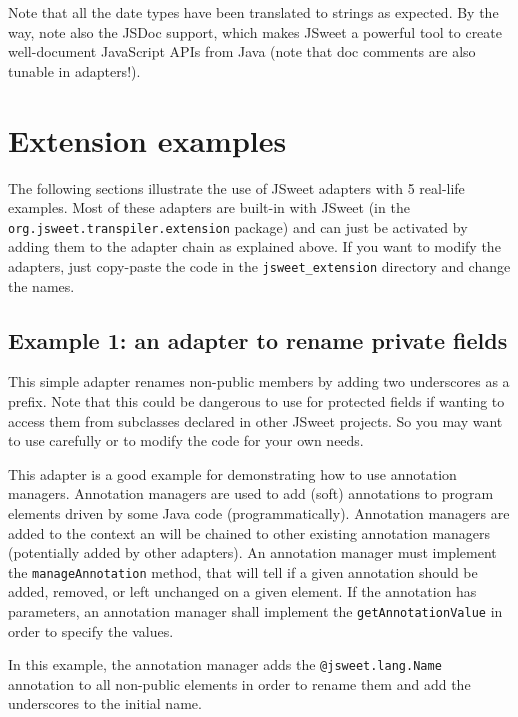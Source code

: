 \documentclass[a4paper]{report}
\begin{document}
Note that all the date types have been translated to strings as expected. By the way, note also the JSDoc support, which makes JSweet a powerful tool to create well-document JavaScript APIs from Java (note that doc comments are also tunable in adapters!).

\section{Extension examples}

The following sections illustrate the use of JSweet adapters with 5 real-life examples. Most of these adapters are built-in with JSweet (in the \texttt{org\-.jsweet\-.transpiler\-.extension} package) and can just be activated by adding them to the adapter chain as explained above. If you want to modify the adapters, just copy-paste the code in the \texttt{jsweet\_extension} directory and change the names.

\subsection{Example 1: an adapter to rename private fields}

This simple adapter renames non-public members by adding two underscores as a prefix.
Note that this could be dangerous to use for protected fields if wanting to access them from subclasses declared in other JSweet projects. So you may want to use carefully or to modify the code for your own needs.

This adapter is a good example for demonstrating how to use annotation managers. Annotation managers are used to add (soft) annotations to program elements driven by some Java code (programmatically). Annotation managers are added to the context an will be chained to other existing annotation managers (potentially added by other adapters). An annotation manager must implement the  \texttt{manageAnnotation} method, that will tell if a given annotation should be added, removed, or left unchanged on a given element. If the annotation has parameters, an annotation manager shall implement the \texttt{getAnnotationValue} in order to specify the values.

In this example, the annotation manager adds the \texttt{@jsweet.lang.Name} annotation to all non-public elements in order to rename them and add the underscores to the initial name.
\end{document}
